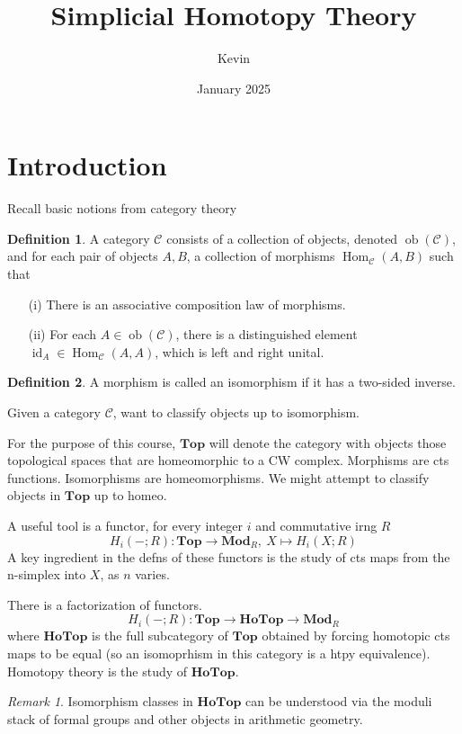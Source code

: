 \documentclass{article}
\title{Simplicial Homotopy Theory}
\author{Kevin}
\date{January 2025}
\theoremstyle{definition}
\newtheorem{defn}{Definition}[section]
\theoremstyle{remark}
\newtheorem{rem}{Remark}
\theoremstyle{plain}
\newcommand{\Hom}{\operatorname{Hom}}
\newcommand{\id}{\operatorname{id}}
\newcommand{\Rmod}{\mathbf{Mod}_R}
\begin{document}
\maketitle
\section{Introduction}
Recall basic notions from category theory
\begin{defn}
    A category $\mathscr{C}$ consists of a collection of objects, denoted $\operatorname{ob}(\mathscr C)$, and for each pair of objects $A,B$, a collection of morphisms $\Hom_{\mathscr C}(A,B)$ such that
    \begin{itemize}
        \item [(i)] There is an associative composition law of morphisms.
        \item[(ii)] For each $A\in\operatorname{ob}(\mathscr C)$, there is a distinguished element $\id_A\in\Hom_{\mathscr C}(A,A)$, which is left and right unital.
    \end{itemize}
\end{defn}
\begin{defn}
    A morphism is called an isomorphism if it has a two-sided inverse.
\end{defn}

Given a category $\mathscr{C}$, want to classify objects up to isomorphism.

For the purpose of this course, $\mathbf{Top}$ will denote the category  with objects those topological spaces that are homeomorphic to a CW complex. Morphisms are cts functions. Isomorphisms are homeomorphisms. We might attempt to classify objects in $\mathbf{Top}$ up to homeo.

A useful tool is a functor, for every integer $i$ and commutative irng $R$
\[H_i(-;R):\mathbf{Top}\to\Rmod,\ X\mapsto H_i(X;R)\]
A key ingredient in the defns of these functors is the study of cts maps from the n-simplex into $X$, as $n$ varies.

There is a factorization of functors.
\[H_i(-;R):\mathbf{Top}\to \mathbf{HoTop}\to\Rmod\]
where $\mathbf{HoTop}$ is the full subcategory of $\mathbf{Top}$ obtained by forcing homotopic cts maps to be equal (so an isomoprhism in this category is a htpy equivalence). Homotopy theory is the study of $\mathbf{HoTop}$.
\begin{rem}
    Isomorphism classes in $\mathbf{HoTop}$ can be understood via the moduli stack of formal groups and other objects in arithmetic geometry.
\end{rem}
\end{document}

